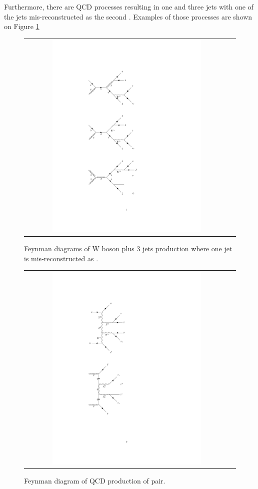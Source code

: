 Furthermore, there are QCD processes resulting in one \hadtau and three jets with one of the jets mis-reconstructed as the second \hadtau. Examples of those processes are shown on Figure \ref{fig:background_W3jets}

\begin{figure}[tbh!]
	\centering
	\begin{tabular}{cc}
		\includegraphics[width=0.75\textwidth]{diagrams/pics/background_W3jets.pdf}
	\end{tabular}
	\caption{Feynman diagrams of W boson plus 3 jets production where one jet is mis-reconstructed as \hadtau. }
	\label{fig:background_W3jets}
\end{figure}

\begin{figure}[tbh!]
	\centering
	\begin{tabular}{cc}
		\includegraphics[width=0.75\textwidth]{diagrams/pics/background_QCDchichi.pdf}
	\end{tabular}
	\caption{Feynman diagram of QCD production of \neutralinotwo pair. }
	\label{fig:background_QCDchichi}
\end{figure}

\clearpage
